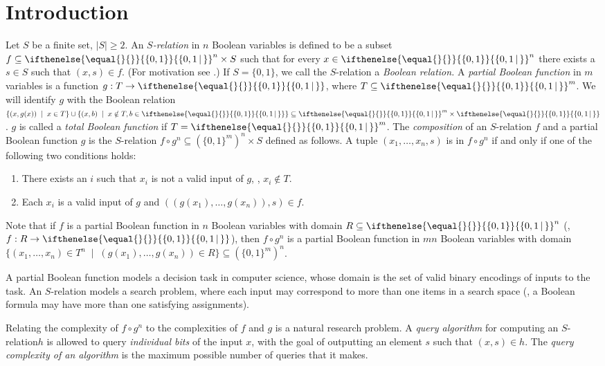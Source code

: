 \documentclass{toc}
\newcommand{\relation}{$S$-relation\xspace}     %
\newcommand{\arelation}{an $S$-relation\xspace} %
\newcommand{\md}{\middle}
\newcommand{\set}[2][]{\ifthenelse{\equal{}{#1}}%
{\ensuremath{\left\{#2\right\}}}%
{\ensuremath{\left\{#2\,\md|\,#1\right\}}}}
\newcommand{\OI}{\set{0,1}}
\newcommand{\e}{\emph}
\begin{document}
\section{Introduction}
\label{intro}
%
Let $S$ be a finite set, $|S|\ge 2$.  %
%
%
An \emph{$S$-relation}  %
in $n$ Boolean
variables is defined to be a subset $f \subseteq \OI^n \times S$
%
%
%
%
such  %
that for every $x \in \OI^n$ there exists a $s \in S$ such that $(x, s) \in f$.
%
%
%
(For motivation see .)  %
%
If $S=\{0,1\}$, we call the \relation a \emph{Boolean relation.}  %
A \emph{partial Boolean function} in $m$ variables is a
function $g:T \to \OI$, where 
%
$T \subseteq \OI^m$.   %
We will identify $g$ with the
Boolean  %
relation $\{(x, g(x))\;\mid\;x \in T\} \cup \{(x, b)\;\mid\;x \notin T, b \in \OI\}\subseteq \OI^m \times \OI$.
%
$g$ is called a \e{total Boolean function} if $T=\OI^m$.
%
The \emph{composition} of %
\arelation  %
$f$ and a partial Boolean function %
$g$ is   %
%
the \relation  %
%
$f \circ g^n \subseteq \left(\{0,1\}^m\right)^n \times S$ 
%
defined as %
follows.  A  %
tuple $(x_1, \ldots, x_n, s)$ is in $f \circ g^n$ 
if and only if one of the
following %
two conditions holds:   %
\begin{enumerate}
    \item There exists an $i$ such that $x_i$ is not a valid input of $g$,
    \ie, $x_i \notin T$. 
\item Each $x_i$ is a valid input of $g$ and $((g(x_1),\ldots,g(x_n)),s)\in f$.
\end{enumerate}
Note that if $f$ is a partial Boolean function
in $n$ Boolean variables with domain $R \subseteq \OI^n$ 
(\ie,  %
$f:R \to \OI$), then $f \circ g^n$ is a partial Boolean function 
in $mn$ Boolean variables with domain 
%
%
%
$\{(x_1,\ldots, x_n) \in T^n \;\mid\;   %
(g(x_1),\ldots, g(x_n)) \in R\} \subseteq \left(\{0,1\}^m\right)^n$.


%
A partial Boolean function models a decision task in computer science, whose domain is the set of valid binary encodings of inputs to the task. An \relation models a search problem, where each input may correspond to more than one items in a search space (\eg, a Boolean formula may have more than one satisfying assignments).

Relating the complexity of $f \circ g^n$ to the complexities of $f$ and $g$ is a natural research problem.
%
%
%
A \e{query algorithm} for computing %
\arelation $h$  %
is allowed to query \e{individual bits} of the input $x$, with the goal of outputting an element $s$ such that $(x, s) \in h $.
%
%
%
The \e{query complexity of an algorithm} is the maximum possible number of queries that it makes.
\end{document}
